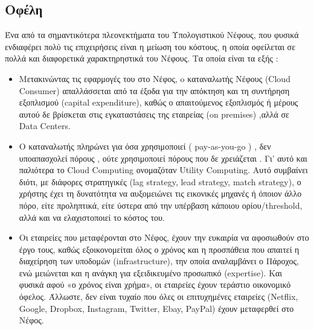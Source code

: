 \documentclass{article}
\begin{document}
\subsection{Οφέλη}
Ένα από τα σημαντικότερα πλεονεκτήματα του Υπολογιστικού Νέφους, που
φυσικά ενδιαφέρει πολύ τις επιχειρήσεις είναι η μείωση του κόστους, η
οποία οφείλεται σε πολλά και διαφορετικά χαρακτηρηστικά του Νέφους. Τα
οποία είναι τα εξής :
\begin{itemize}
\item        Μετακινώντας τις εφαρμογές του στο Νέφος, o καταναλωτής Νέφους
(Cloud Consumer)
απαλλάσσεται από τα έξοδα για την απόκτηση και τη συντήρηση εξοπλισμού
(capital expenditure), καθώς
ο απαιτούμενος εξοπλισμός ή μέρους αυτού δε βρίσκεται στις εγκαταστάσεις
της εταιρείας (on premises)
,αλλά σε Data
Centers.

\item        Ο καταναλωτής πληρώνει για όσα χρησιμοποιεί
( pay-as-you-go ) , δεν υποαπασχολεί πόρους , ούτε
χρησιμοποιεί πόρους που δε χρειάζεται . Γι’ αυτό και παλιότερα
το Cloud Computing
ονομαζόταν Utility
Computing. Αυτό συμβαίνει διότι, με διάφορες
στρατηγικές (lag strategy, lead strategy, match
strategy), ο χρήστης έχει τη δυνατότητα να
αυξομειώνει τις εικονικές μηχανές ή όποιον άλλο πόρο, είτε προληπτικά,
είτε ύστερα από την υπέρβαση κάποιου
ορίου/threshold, αλλά και να
ελαχιστοποιεί το κόστος του.

\item        Οι εταιρείες που μεταφέρονται στο Νέφος, έχουν την ευκαιρία να
αφοσιωθούν στο έργο τους, καθώς εξοικονομείται όλος ο χρόνος και η
προσπάθεια που απαιτεί η διαχείρηση των υποδομών
(infrastructure), την οποία
αναλαμβάνει ο Πάροχος, ενώ μειώνεται και η ανάγκη για εξειδικευμένο
προσωπικό (expertise). Και
φυσικά αφού «ο χρόνος είναι χρήμα», οι εταιρείες έχουν τεράστιο οικονομικό
όφελος. Άλλωστε, δεν είναι τυχαίο που όλες οι επιτυχημένες εταιρείες
(Netflix, Google, Dropbox, Instagram, Twitter,
Ebay, PayPal) έχουν μεταφερθεί στο Νέφος.


\end{itemize}
\end{document}
